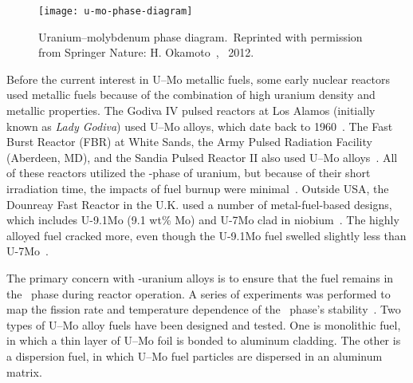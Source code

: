 


\begin{figure}
\centering
\texttt{[image: u-mo-phase-diagram]}
\caption[Uranium--molybdenum phase diagram]{Uranium--molybdenum phase diagram\@.\ Reprinted with permission from Springer Nature: H. Okamoto~\cite{okamoto2012mo}, \textcopyright\ 2012\@.}
\label{fig:umophase}
\end{figure}

Before the current interest in U--Mo metallic fuels, some early nuclear reactors used metallic fuels because of the combination of high uranium density and metallic properties. The Godiva IV pulsed reactors at Los Alamos (initially known as \textit{Lady Godiva}) used U--Mo alloys, which date back to 1960~\cite{wimett1965fast}. The Fast Burst Reactor (FBR) at White Sands, the Army Pulsed Radiation Facility (Aberdeen, MD), and the Sandia Pulsed Reactor II also used U--Mo alloys~\cite{wimett1965fast, mihalczo1969static, bonzon1973sandia}. All of these reactors utilized the \textgamma-phase of uranium, but because of their short irradiation time, the impacts of fuel burnup were minimal~\cite{horak1973operating}. Outside USA, the Dounreay Fast Reactor in the U.K. used a number of metal-fuel-based designs, which includes U-9.1Mo (9.1 wt\% Mo) and U-7Mo clad in niobium~\cite{matthews1964performance}. The highly alloyed fuel cracked more, even though the U-9.1Mo fuel swelled slightly less than U-7Mo~\cite{cottrell1964development}. %

The primary concern with \textgamma-uranium alloys is to ensure that the fuel remains in the \textgamma~phase during reactor operation. A series of experiments was performed to map the fission rate and temperature dependence of the \textgamma~phase's stability~\cite{no2003iaea}. Two types of U--Mo alloy fuels have been designed and tested. One is monolithic fuel, in which a thin layer of U--Mo foil is bonded to aluminum cladding. The other is a dispersion fuel, in which U--Mo fuel particles are dispersed in an aluminum matrix.



